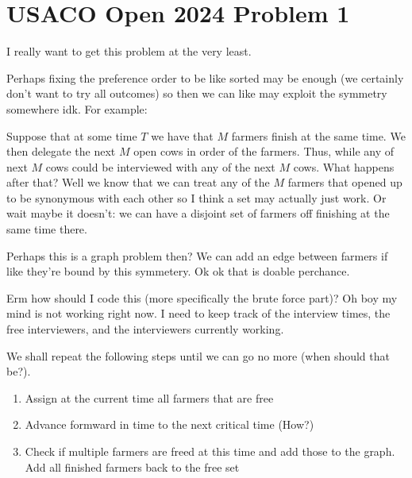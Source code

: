 \documentclass[a4paper, 12pt]{article}
\begin{document}
\section*{USACO Open 2024 Problem 1}

I really want to get this problem at the very least.

\begin{observation}
    Perhaps fixing the preference order to be like sorted may be enough (we certainly don't want to try all outcomes) so then we can like may exploit the symmetry somewhere idk. For example:

    Suppose that at some time \( T \) we have that \( M \) farmers finish at the same time. We then delegate the next \( M \) open cows in order of the farmers. Thus, while any of next \( M \) cows could be interviewed with any of the next \( M \) cows. What happens after that? Well we know that we can treat any of the \( M \) farmers that opened up to be synonymous with each other so I think a set may actually just work. Or wait maybe it doesn't: we can have a disjoint set of farmers off finishing at the same time there.

    Perhaps this is a graph problem then? We can add an edge between farmers if like they're bound by this symmetery. Ok ok that is doable perchance.
\end{observation}

\begin{observation}
    Erm how should I code this (more specifically the brute force part)? Oh boy my mind is not working right now. I need to keep track of the interview times, the free interviewers, and the interviewers currently working.

    We shall repeat the following steps until we can go no more (when should that be?).
    \begin{enumerate}[topsep=0pt]
        \item Assign at the current time all farmers that are free
        \item Advance formward in time to the next critical time (How?)
        \item Check if multiple farmers are freed at this time and add those to the graph. Add all finished farmers back to the free set
    \end{enumerate}
\end{observation}

\begin{solution}
\end{solution}
\end{document}
